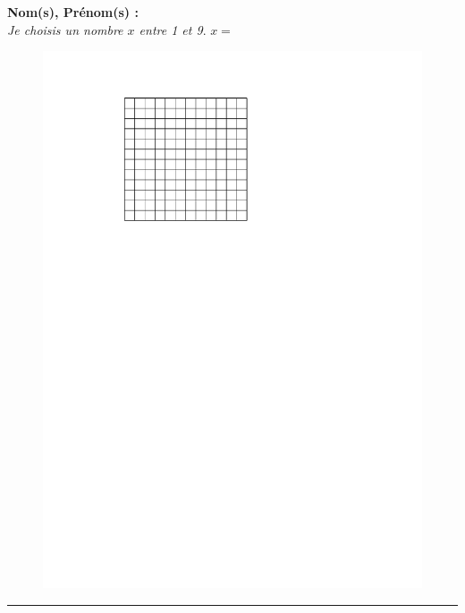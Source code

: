 \documentclass[12pt]{article}
\newcommand{\horrule}[1]{\rule{\linewidth}{#1}} %
\begin{document}

\textbf{Nom(s), Prénom(s) :}\\
\textit{Je choisis un nombre $x$ entre 1 et 9}. $x = $


\begin{figure}[H]
  \centering
  \includegraphics[width=0.7\linewidth]{sources/1/grille-dm.pdf}
\end{figure}

\horrule{1px}
\end{document}
